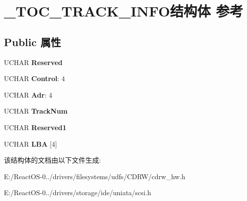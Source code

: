 \hypertarget{struct___t_o_c___t_r_a_c_k___i_n_f_o}{}\section{\+\_\+\+T\+O\+C\+\_\+\+T\+R\+A\+C\+K\+\_\+\+I\+N\+F\+O结构体 参考}
\label{struct___t_o_c___t_r_a_c_k___i_n_f_o}
\subsection*{Public 属性}
\begin{DoxyCompactItemize}
\item 
\mbox{\label{struct___t_o_c___t_r_a_c_k___i_n_f_o_ab3faa543e35dc2d6f2af02dc191a4033}} 
U\+C\+H\+AR {\bfseries Reserved}
\item 
\mbox{\label{struct___t_o_c___t_r_a_c_k___i_n_f_o_a6c0f3a84cf3e53262f6d5eda05e66f73}} 
U\+C\+H\+AR {\bfseries Control}\+: 4
\item 
\mbox{\label{struct___t_o_c___t_r_a_c_k___i_n_f_o_a5a21665f1e739c578ba131498f090060}} 
U\+C\+H\+AR {\bfseries Adr}\+: 4
\item 
\mbox{\label{struct___t_o_c___t_r_a_c_k___i_n_f_o_a197a8ebc4df70e02aa49e25fd8ad691b}} 
U\+C\+H\+AR {\bfseries Track\+Num}
\item 
\mbox{\label{struct___t_o_c___t_r_a_c_k___i_n_f_o_a6d212ce99644ff9ce9ee4d77079f3fda}} 
U\+C\+H\+AR {\bfseries Reserved1}
\item 
\mbox{\label{struct___t_o_c___t_r_a_c_k___i_n_f_o_a125fd1d06a486aa7ac45bfbb949682d7}} 
U\+C\+H\+AR {\bfseries L\+BA} \mbox{[}4\mbox{]}
\end{DoxyCompactItemize}


该结构体的文档由以下文件生成\+:\begin{DoxyCompactItemize}
\item 
E\+:/\+React\+O\+S-\/0../drivers/filesystems/udfs/\+C\+D\+R\+W/cdrw\+\_\+hw.\+h\item 
E\+:/\+React\+O\+S-\/0../drivers/storage/ide/uniata/scsi.\+h\end{DoxyCompactItemize}
